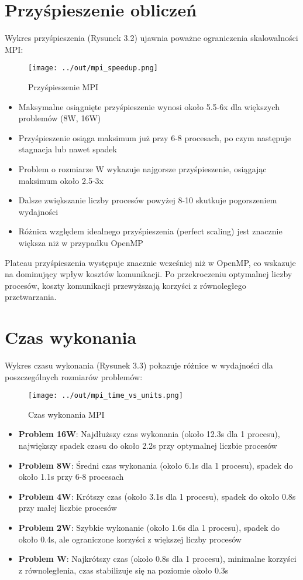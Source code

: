 \documentclass[12pt,a4paper]{report}
\begin{document}
\section{Przyśpieszenie obliczeń}
Wykres przyśpieszenia (Rysunek 3.2) ujawnia poważne ograniczenia skalowalności MPI:
\begin{figure}[h]
    \centering
    \texttt{[image: ../out/mpi\_speedup.png]}
    \caption{Przyśpieszenie MPI}
    \label{fig:mpi_speedup}
\end{figure}
\begin{itemize}
    \item Maksymalne osiągnięte przyśpieszenie wynosi około 5.5-6x dla większych problemów (8W, 16W)
    \item Przyśpieszenie osiąga maksimum już przy 6-8 procesach, po czym następuje stagnacja lub nawet spadek
    \item Problem o rozmiarze W wykazuje najgorsze przyśpieszenie, osiągając maksimum około 2.5-3x
    \item Dalsze zwiększanie liczby procesów powyżej 8-10 skutkuje pogorszeniem wydajności
    \item Różnica względem idealnego przyśpieszenia (perfect scaling) jest znacznie większa niż w przypadku OpenMP
\end{itemize}

Plateau przyśpieszenia występuje znacznie wcześniej niż w OpenMP, co wskazuje na dominujący wpływ kosztów komunikacji. Po przekroczeniu optymalnej liczby procesów, koszty komunikacji przewyższają korzyści z równoległego przetwarzania.

\section{Czas wykonania}
Wykres czasu wykonania (Rysunek 3.3) pokazuje różnice w wydajności dla poszczególnych rozmiarów problemów:
\begin{figure}[h]
    \centering
    \texttt{[image: ../out/mpi\_time\_vs\_units.png]}
    \caption{Czas wykonania MPI}
    \label{fig:mpi_time}
\end{figure}
\begin{itemize}
    \item \textbf{Problem 16W}: Najdłuższy czas wykonania (około 12.3s dla 1 procesu), największy spadek czasu do około 2.2s przy optymalnej liczbie procesów
    \item \textbf{Problem 8W}: Średni czas wykonania (około 6.1s dla 1 procesu), spadek do około 1.1s przy 6-8 procesach
    \item \textbf{Problem 4W}: Krótszy czas (około 3.1s dla 1 procesu), spadek do około 0.8s przy małej liczbie procesów
    \item \textbf{Problem 2W}: Szybkie wykonanie (około 1.6s dla 1 procesu), spadek do około 0.4s, ale ograniczone korzyści z większej liczby procesów
    \item \textbf{Problem W}: Najkrótszy czas (około 0.8s dla 1 procesu), minimalne korzyści z równoległenia, czas stabilizuje się na poziomie około 0.3s
\end{itemize}
\end{document}
